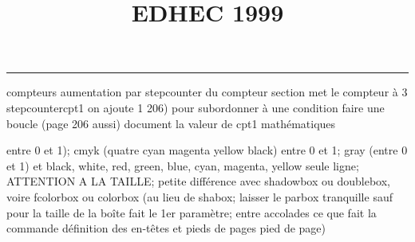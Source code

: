 \documentclass[11pt]{article}%
\title{\bf \vspace{-2cm} EDHEC 1999} %
\author{} %
\date{} %
\renewcommand{\headrulewidth}{0pt}%
\renewcommand{\footrulewidth}{0.4pt}%
\begin{document}
\maketitle %
\vspace{-1.4cm}\hrule %
\thispagestyle{fancy}

\vspace*{.2cm}



compteurs%
aumentation par stepcounter du compteur section%
met le compteur à 3%
stepcounter{cpt1} on ajoute 1%
206) pour subordonner à une condition %
faire une boucle (page 206 aussi) %
document la valeur de cpt1 
mathématiques\newcommand{\ch}{\operatorname{ch}} 
\newcommand{\sh}{\operatorname{sh}}
\renewcommand{\tanh}{\operatorname{th}}
\renewcommand{\sinh}{\operatorname{sh}}
\renewcommand{\cosh}{\operatorname{ch}}
\newcommand{\argsh}{\operatorname{argsh}}
\newcommand{\argch}{\operatorname{argch}}
\newcommand{\argth}{\operatorname{argth}}
\newcommand{\ker}{\operatorname{Ker}}
\renewcommand{\im}{\operatorname{Im}}
\newcommand{\rg}{\operatorname{rg}}
\newcommand{\Id}{\operatorname{Id}}
\newcommand{\id}{\operatorname{id}}
\renewcommand{\leq}{\leq}
\renewcommand{\geq}{\geq }

entre 0 et 1); cmyk (quatre cyan magenta yellow black) entre 0 et 1;
gray (entre 0 et 1) et black, white, red, green, blue, cyan, magenta,
yellow%
seule ligne; ATTENTION A LA TAILLE; petite différence avec shadowbox ou
doublebox, voire fcolorbox ou colorbox (au lieu de shabox; laisser le
parbox tranquille sauf pour la taille de la boîte
\newcommand{\Tbox}[1]{\begin{center} \shabox{\parbox{0.6
\linewidth}{#1}} \end{center}} %
fait le 1er paramètre; entre accolades ce que fait la commande
définition des en-têtes et pieds de pages\pagestyle{fancy}
\chead{}
\rfoot[ \ \thepage]{\thepage}
\cfoot{}
\lfoot{}
\thispagestyle{fancy} %
pied de page)\renewcommand{\footrulewidth}{0.4pt}
\renewcommand{\headrulewidth}{0.4pt}
\end{document}
